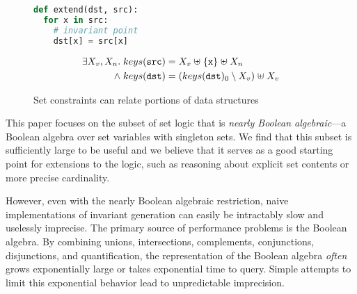 \begin{figure}[tb]
    \newbox\exprogbox
    \begin{lrbox}{\exprogbox}
        \begin{minipage}[t][1cm][b]{0.4\textwidth}
        \begin{lstlisting}[language=python]
def extend(dst, src):
  for x in src:
    # invariant point
    dst[x] = src[x]
        \end{lstlisting}
        \end{minipage}
    \end{lrbox}
    \newbox\exproginv
    \begin{lrbox}{\exproginv}
        \begin{minipage}[t][0.9cm][b]{0.4\textwidth}
        \begin{align*}
        \exists X_v, X_n. \; keys(\texttt{src}) &= X_v \mathrel{\uplus} \{\texttt{x}\} \mathrel{\uplus} X_n \\
        {} \mathrel{\wedge} keys(\texttt{dst}) &= (keys(\texttt{dst})_0 \setminus X_v) \mathrel{\uplus} X_v
        \end{align*}
        \end{minipage}
    \end{lrbox}
    \centering
    \quad
    \caption{Set constraints can relate portions of data structures}
    \label{fig:intro-example}
\end{figure}



This paper focuses on the subset of set logic that is \emph{nearly Boolean algebraic}---a Boolean algebra over set variables with singleton sets.  We find that this subset is sufficiently large to be useful and we believe that it serves as a good starting point for extensions to the logic, such as reasoning about explicit set contents or more precise cardinality.

However, even with the nearly Boolean algebraic restriction, naive implementations of invariant generation can easily be intractably slow and uselessly imprecise.  The primary source of performance problems is the Boolean algebra.  By combining unions, intersections, complements, conjunctions, disjunctions, and quantification, the representation of the Boolean algebra \emph{often} grows exponentially large or takes exponential time to query.  Simple attempts to limit this exponential behavior lead to unpredictable imprecision.

